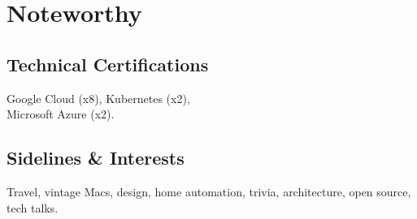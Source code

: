 \documentclass[]{cvpn}
\begin{document}
\begin{multicols}{2}
\begin{eventlist}
\end{eventlist}

\section{Noteworthy}

\subsection{Technical Certifications}
Google Cloud (x8), Kubernetes (x2),\\Microsoft Azure (x2).\\




\subsection{Sidelines \& Interests}
Travel, vintage Macs, design, home automation,
trivia, architecture, open source, tech talks.


\end{multicols}
\end{document}
